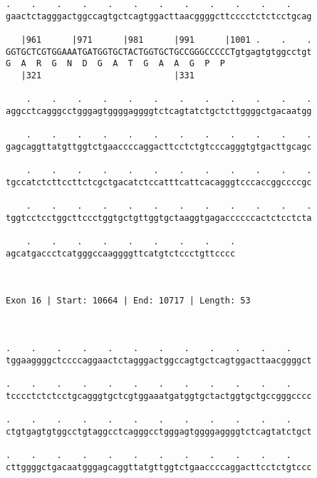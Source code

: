 \documentclass{article}
\begin{document}
\begin{Verbatim}
.    .    .    .    .    .    .    .    .    .    .    .    
gaactctagggactggccagtgctcagtggacttaacggggcttcccctctctcctgcag
                                                            
   |961      |971      |981      |991      |1001 .    .    .
GGTGCTCGTGGAAATGATGGTGCTACTGGTGCTGCCGGGCCCCCTgtgagtgtggcctgt
G  A  R  G  N  D  G  A  T  G  A  A  G  P  P                 
   |321                          |331                       
  
    .    .    .    .    .    .    .    .    .    .    .    .
aggcctcagggcctgggagtggggaggggtctcagtatctgctcttggggctgacaatgg
                                                            
    .    .    .    .    .    .    .    .    .    .    .    .
gagcaggttatgttggtctgaaccccaggacttcctctgtcccagggtgtgacttgcagc
                                                            
    .    .    .    .    .    .    .    .    .    .    .    .
tgccatctcttccttctcgctgacatctccatttcattcacagggtcccaccggccccgc
                                                            
    .    .    .    .    .    .    .    .    .    .    .    .
tggtcctcctggcttccctggtgctgttggtgctaaggtgagaccccccactctcctcta
                                                            
    .    .    .    .    .    .    .    .    .
agcatgaccctcatgggccaaggggttcatgtctccctgttcccc
                                             
                                             
 
Exon 16 | Start: 10664 | End: 10717 | Length: 53



.    .    .    .    .    .    .    .    .    .    .    .    
tggaaggggctccccaggaactctagggactggccagtgctcagtggacttaacggggct
                                                            
.    .    .    .    .    .    .    .    .    .    .    .    
tcccctctctcctgcagggtgctcgtggaaatgatggtgctactggtgctgccgggcccc
                                                            
.    .    .    .    .    .    .    .    .    .    .    .    
ctgtgagtgtggcctgtaggcctcagggcctgggagtggggaggggtctcagtatctgct
                                                            
.    .    .    .    .    .    .    .    .    .    .    .    
cttggggctgacaatgggagcaggttatgttggtctgaaccccaggacttcctctgtccc
                                                            

\end{Verbatim}
\end{document}
